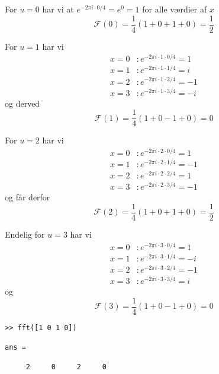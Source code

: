 \documentclass[a4paper, 10pt, danish, final]{article}
\begin{document}
For $u = 0$ har vi at $e^{-2\pi i \cdot 0/4} = e^{0} = 1$ for alle
værdier af $x$
\begin{equation}
    \mathcal{F}(0) = \frac{1}{4}(1 + 0 + 1 + 0) = \frac{1}{2}
\end{equation}

For $u = 1$ har vi
\begin{align}
    x = 0 & : e^{-2\pi i \cdot 1 \cdot 0/4} = 1\\
    x = 1 & : e^{-2\pi i \cdot 1 \cdot 1/4} = i\\
    x = 2 & : e^{-2\pi i \cdot 1 \cdot 2/4} = -1\\
    x = 3 & : e^{-2\pi i \cdot 1 \cdot 3/4} = -i
\end{align}
og derved
\begin{equation}
    \mathcal{F}(1) = \frac{1}{4}(1 + 0 - 1 + 0) = 0
\end{equation}

For $u = 2$ har vi
\begin{align}
    x = 0 & : e^{-2\pi i \cdot 2 \cdot 0/4} = 1\\
    x = 1 & : e^{-2\pi i \cdot 2 \cdot 1/4} = -1\\
    x = 2 & : e^{-2\pi i \cdot 2 \cdot 2/4} = 1\\
    x = 3 & : e^{-2\pi i \cdot 2 \cdot 3/4} = -1
\end{align}
og får derfor
\begin{equation}
    \mathcal{F}(2) = \frac{1}{4}(1 + 0 + 1 + 0) = \frac{1}{2}
\end{equation}

Endelig for $u = 3$ har vi
\begin{align}
    x = 0 & : e^{-2\pi i \cdot 3 \cdot 0/4} = 1\\
    x = 1 & : e^{-2\pi i \cdot 3 \cdot 1/4} = -i\\
    x = 2 & : e^{-2\pi i \cdot 3 \cdot 2/4} = -1\\
    x = 3 & : e^{-2\pi i \cdot 3 \cdot 3/4} = i
\end{align}
og
\begin{equation}
    \mathcal{F}(3) = \frac{1}{4}(1 + 0 - 1 + 0) = 0
\end{equation}

\begin{lstlisting}[caption={Fouriertransformation i MATLAB
    (kommandoprompt)}, captionpos=b,
    label={fft_matlab}, float=t, numbers=none]
>> fft([1 0 1 0])

ans =

     2     0     2     0

\end{lstlisting}
\end{document}
